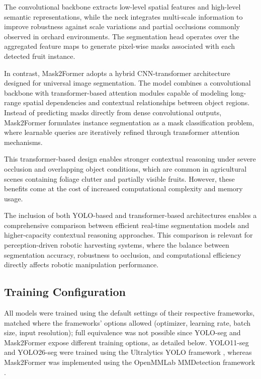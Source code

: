 \documentclass[runningheads]{llncs}
\begin{document}
The convolutional backbone extracts low-level spatial features and high-level
semantic representations, while the neck integrates multi-scale information to
improve robustness against scale variations and partial occlusions commonly
observed in orchard environments. The segmentation head operates over the
aggregated feature maps to generate pixel-wise masks associated with each
detected fruit instance.

In contrast, Mask2Former adopts a hybrid CNN-transformer architecture designed
for universal image segmentation. The model combines a convolutional backbone
with transformer-based attention modules capable of modeling long-range spatial
dependencies and contextual relationships between object regions. Instead of
predicting masks directly from dense convolutional outputs, Mask2Former formulates
instance segmentation as a mask classification problem, where learnable queries
are iteratively refined through transformer attention mechanisms.

This transformer-based design enables stronger contextual reasoning under severe
occlusion and overlapping object conditions, which are common in agricultural
scenes containing foliage clutter and partially visible fruits. However, these
benefits come at the cost of increased computational complexity and memory usage.

The inclusion of both YOLO-based and transformer-based architectures enables a
comprehensive comparison between efficient real-time segmentation models and
higher-capacity contextual reasoning approaches. This comparison is relevant for perception-driven robotic harvesting systems, where the balance between segmentation
accuracy, robustness to occlusion, and computational efficiency directly affects
robotic manipulation performance.


\subsection{Training Configuration}

All models were trained using the default settings of their respective
frameworks, matched where the frameworks' options allowed (optimizer,
learning rate, batch size, input resolution); full equivalence was not
possible since YOLO-seg and Mask2Former expose different training options,
as detailed below. YOLO11-seg and YOLO26-seg were trained using the Ultralytics
YOLO framework \cite{ultralytics_yolo}, whereas Mask2Former was implemented
using the OpenMMLab MMDetection framework \cite{mmdetection2019}.
\end{document}
